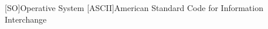 \begin{acronym}[WWWW]

[SO]{Operative System}
[ASCII]{American Standard Code for Information Interchange}

\end{acronym}
